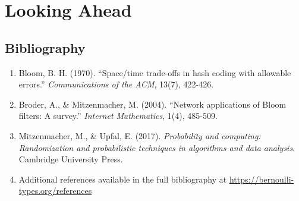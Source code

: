 \documentclass[11pt,oneside]{book}
\begin{document}







\part{Looking Ahead}



\appendix




\backmatter

\chapter*{Bibliography}

\begin{enumerate}
\item Bloom, B. H. (1970). ``Space/time trade-offs in hash coding with allowable errors.'' \textit{Communications of the ACM}, 13(7), 422-426.

\item Broder, A., \& Mitzenmacher, M. (2004). ``Network applications of Bloom filters: A survey.'' \textit{Internet Mathematics}, 1(4), 485-509.

\item Mitzenmacher, M., \& Upfal, E. (2017). \textit{Probability and computing: Randomization and probabilistic techniques in algorithms and data analysis}. Cambridge University Press.

\item Additional references available in the full bibliography at \url{https://bernoulli-types.org/references}
\end{enumerate}

\printindex
\end{document}

